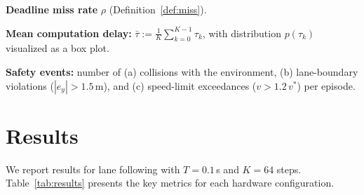 \documentclass[conference]{IEEEtran}
\begin{document}
\noindent\textbf{Deadline miss rate} $\rho$ (Definition~\ref{def:miss}).

\noindent\textbf{Mean computation delay:}
$\bar{\tau} := \frac{1}{K}\sum_{k=0}^{K-1} \tau_k$, with distribution
$p(\tau_k)$ visualized as a box plot.

\noindent\textbf{Safety events:} number of (a) collisions with the
environment, (b) lane-boundary violations ($|e_y| > 1.5$\,m), and
(c) speed-limit exceedances ($v > 1.2\,v^*$) per episode.
\section{Results}\label{sec:results}

We report results for lane following with $T = 0.1$\,s and
$K = 64$ steps.  Table~\ref{tab:results} presents the key
metrics for each hardware configuration.
\end{document}
